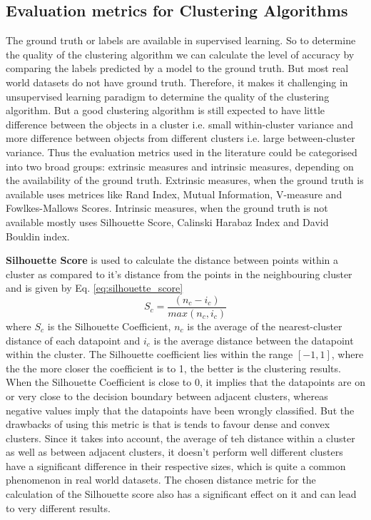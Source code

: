 \subsection{Evaluation metrics for Clustering Algorithms}
The ground truth or labels are available in supervised learning. So to determine the quality of the clustering algorithm we can calculate the level of accuracy by comparing the labels predicted by a model to the ground truth. But most real world datasets do not have ground truth. Therefore, it makes it challenging in unsupervised learning paradigm to determine the quality of the clustering algorithm. But a good clustering algorithm is still expected to have little difference between the objects in a cluster i.e. small within-cluster variance and more difference between objects from different clusters i.e. large between-cluster variance. Thus the evaluation metrics used in the literature could be categorised into two broad groups: extrinsic measures and intrinsic measures, depending on the availability of the ground truth. Extrinsic measures, when the ground truth is available uses metrices like Rand Index, Mutual Information, V-measure and Fowlkes-Mallows Scores. Intrinsic measures, when the ground truth is not available mostly uses Silhouette Score, Calinski Harabaz Index and David Bouldin index.

\vspace{5 mm}

\textbf{Silhouette Score} is used to calculate the distance between points within a cluster as compared to it's distance from the points in the neighbouring cluster and is given by Eq. \ref*{eq:silhouette_score}
\begin{equation}
  \label{eq:silhouette_score}
  \mathit{S_{c}}= \mathit{\frac{(n_{c}-i_{c})}{max(n_{c},i_{c})}}
\end{equation}
where $S_{c}$ is the Silhouette Coefficient, $n_{c}$ is the average of the nearest-cluster distance of each datapoint and $i_{c}$ is the average distance between the datapoint within the cluster. The Silhouette coefficient lies within the range $[-1,1]$, where the the more closer the coefficient is to 1, the better is the clustering results. When the Silhouette Coefficient is close to 0, it implies that the datapoints are on or very close to the decision boundary between adjacent clusters, whereas negative values imply that the datapoints have been wrongly classified. But the drawbacks of using this metric is that is tends to favour dense and convex clusters. Since it takes into account, the average of teh distance within a cluster as well as between adjacent clusters, it doesn't perform well different clusters have a significant difference in their respective sizes, which is quite a common phenomenon in real world datasets. The chosen distance metric for the calculation of the Silhouette score also has a significant effect on it and can lead to very different results.


